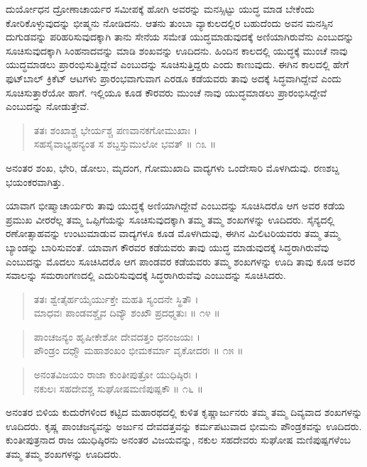 ದುರ್ಯೋಧನ ದ್ರೋಣಾಚಾರ್ಯರ ಸಮೀಪಕ್ಕೆ ಹೋಗಿ ಅವರನ್ನು ಮನಸ್ಸಿಟ್ಟು ಯುದ್ಧ ಮಾಡ ಬೇಕೆಂದು ಕೋರಿಕೊಳ್ಳುವುದನ್ನು ಭೀಷ್ಮನು ನೋಡಿದನು. ಆತನು ತುಂಬಾ ವ್ಯಾಕುಲದಲ್ಲಿರ ಬಹುದೆಂದು ಅವನ ಮನಸ್ಸಿನ ದುಗುಡವನ್ನು ಪರಿಹರಿಸುವುದಕ್ಕಾಗಿ ತಾನು ಸೇನೆಯ ಸಮೇತ ಯುದ್ಧಮಾಡುವುದಕ್ಕೆ ಅಣಿಯಾಗಿರುವೆನು ಎಂಬುದನ್ನು ಸೂಚಿಸುವುದಕ್ಕಾಗಿ ಸಿಂಹನಾದವನ್ನು ಮಾಡಿ ಶಂಖವನ್ನು ಊದಿದನು. ಹಿಂದಿನ ಕಾಲದಲ್ಲಿ ಯುದ್ಧಕ್ಕೆ ಮುಂಚೆ ನಾವು ಯುದ್ಧಮಾಡಲು ಪ್ರಾರಂಭಿಸುತ್ತಿದ್ದೇವೆ ಎಂಬುದನ್ನು ಸೂಚಿಸುತ್ತಿದ್ದರು ಎಂದು ಕಾಣುವುದು. ಈಗಿನ ಕಾಲದಲ್ಲಿ ಹೇಗೆ ಫುಟ್​ಬಾಲ್ ಕ್ರಿಕೆಟ್ ಆಟಗಳು ಪ್ರಾರಂಭವಾಗುವಾಗ ಎರಡೂ ಕಡೆಯವರು ತಾವು ಅದಕ್ಕೆ ಸಿದ್ಧವಾಗಿದ್ದೇವೆ ಎಂದು ಸೂಚಿಸುತ್ತಾರೆಯೋ ಹಾಗೆ. ಇಲ್ಲಿಯೂ ಕೂಡ ಕೌರವರು ಮುಂಚೆ ನಾವು ಯುದ್ಧಮಾಡಲು ಪ್ರಾರಂಭಿಸಿದ್ದೇವೆ ಎಂಬುದನ್ನು ನೋಡುತ್ತೇವೆ.

\begin{verse}
ತತಃ ಶಂಖಾಶ್ಚ ಭೇರ್ಯಶ್ಚ ಪಣವಾನಕಗೋಮುಖಾಃ ।\\ಸಹಸೈವಾಭ್ಯಹನ್ಯಂತ ಸ ಶಬ್ದಸ್ತುಮುಲೋ ಭವತ್ \num{॥ ೧೩ ॥}
\end{verse}

{\small ಅನಂತರ ಶಂಖ, ಭೇರಿ, ಡೋಲು, ಮೃದಂಗ, ಗೋಮುಖಾದಿ ವಾದ್ಯಗಳು ಒಂದೇಸಾರಿ ಮೊಳಗಿದುವು. ರಣಶಬ್ದ ಭಯಂಕರವಾಗಿತ್ತು.}

ಯಾವಾಗ ಭೀಷ್ಮಾಚಾರ್ಯರು ತಾವು ಯುದ್ಧಕ್ಕೆ ಅಣಿಯಾಗಿದ್ದೇವೆ ಎಂಬುದನ್ನು ಸೂಚಿಸಿದರೊ ಆಗ ಅವರ ಕಡೆಯ ಪ್ರಮುಖ ವೀರರೆಲ್ಲ ತಮ್ಮ ಒಪ್ಪಿಗೆಯನ್ನು ಸೂಚಿಸುವುದಕ್ಕಾಗಿ ತಮ್ಮ ತಮ್ಮ ಶಂಖಗಳನ್ನು ಊದಿದರು. ಸೈನ್ಯದಲ್ಲಿ ರಣೋತ್ಸಾಹವನ್ನು ಉಂಟುಮಾಡುವ ವಾದ್ಯಗಳೂ ಕೂಡ ಮೊಳಗಿದುವು, ಈಗಿನ ಮಿಲಿಟರಿಯವರು ತಮ್ಮ ತಮ್ಮ ಬ್ಯಾಂಡನ್ನು ಬಾರಿಸುವಂತೆ. ಯಾವಾಗ ಕೌರವರ ಕಡೆಯವರು ತಾವು ಯುದ್ಧ ಮಾಡುವುದಕ್ಕೆ ಸಿದ್ಧರಾಗಿರುವೆವು ಎಂಬುದನ್ನು ಮೊದಲು ಸೂಚಿಸಿದರೊ ಆಗ ಪಾಂಡವರ ಕಡೆಯವರು ತಮ್ಮ ಶಂಖಗಳನ್ನು ಊದಿ ತಾವು ಕೂಡ ಅವರ ಸವಾಲನ್ನು ಸಮರಾಂಗಣದಲ್ಲಿ ಎದುರಿಸುವುದಕ್ಕೆ ಸಿದ್ಧರಾಗಿರುವೆವು ಎಂಬುದನ್ನು ಸೂಚಿಸಿದರು.

\begin{verse}
ತತಃ ಶ್ವೇತೈರ್ಹಯೈರ್ಯುಕ್ತೇ ಮಹತಿ ಸ್ಯಂದನೇ ಸ್ಥಿತೌ ।\\ಮಾಧವಃ ಪಾಂಡವಶ್ಚೈವ ದಿವ್ಯೌ ಶಂಖೌ ಪ್ರದಧ್ಮತುಃ \num{॥ ೧೪ ॥}
\end{verse}

\begin{verse}
ಪಾಂಚಜನ್ಯಂ ಹೃಷೀಕೇಶೋ ದೇವದತ್ತಂ ಧನಂಜಯಃ ।\\ಪೌಂಡ್ರಂ ದಧ್ಮೌ ಮಹಾಶಂಖಂ ಭೀಮಕರ್ಮಾ ವೃಕೋದರಃ \num{॥ ೧೫ ॥}
\end{verse}

\begin{verse}
ಅನಂತವಿಜಯಂ ರಾಜಾ ಕುಂತೀಪುತ್ರೋ ಯುಧಿಷ್ಠಿರಃ ।\\ನಕುಲಃ ಸಹದೇವಶ್ಚ ಸುಘೋಷಮಣಿಪುಷ್ಪಕೌ \num{॥ ೧೬ ॥}
\end{verse}

{\small ಅನಂತರ ಬಿಳಿಯ ಕುದುರೆಗಳಿಂದ ಕಟ್ಟಿದ ಮಹಾರಥದಲ್ಲಿ ಕುಳಿತ ಕೃಷ್ಣಾರ್ಜುನರು ತಮ್ಮ ತಮ್ಮ ದಿವ್ಯವಾದ ಶಂಖಗಳನ್ನು ಊದಿದರು. ಕೃಷ್ಣ ಪಾಂಚಜನ್ಯವನ್ನು ಅರ್ಜುನ ದೇವದತ್ತವನ್ನು ಕರ್ಮಪಟುವಾದ ಭೀಮನು ಪೌಂಡ್ರಕವನ್ನು ಊದಿದರು. ಕುಂತೀಪುತ್ರನಾದ ರಾಜ ಯುಧಿಷ್ಠಿರನು ಅನಂತರ ವಿಜಯವನ್ನು, ನಕುಲ ಸಹದೇವರು ಸುಘೋಷ ಮಣಿಪುಷ್ಪಗಳೆಂಬ ತಮ್ಮ ತಮ್ಮ ಶಂಖಗಳನ್ನು ಊದಿದರು.}

